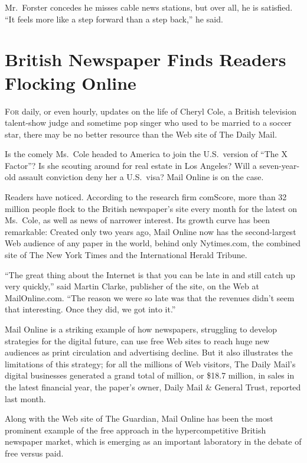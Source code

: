 ﻿\documentclass[12pt]{article}
\begin{document}
Mr.~Forster concedes he misses cable news stations, but over all, he is satisfied. ``It feels more
like a step forward than a step back,'' he said.

\section{British Newspaper Finds Readers Flocking Online}

\lettrine{F}{or} daily, or even hourly, updates on the life of Cheryl Cole,
a British television talent-show judge and sometime pop singer who used to be married to a soccer
star, there may be no better resource than the Web site of The Daily Mail.

Is the comely Ms.~Cole headed to America to join the U.S.~version of ``The X Factor''? Is she
scouting around for real estate in Los Angeles? Will a seven-year-old assault conviction deny her a
U.S.~visa? Mail Online is on the case.

Readers have noticed. According to the research firm comScore, more than 32 million people flock to
the British newspaper's site every month for the latest on Ms.~Cole, as well as news of narrower
interest. Its growth curve has been remarkable: Created only two years ago, Mail Online now has the
second-largest Web audience of any paper in the world, behind only Nytimes.com, the combined site of
The New York Times and the International Herald Tribune.

``The great thing about the Internet is that you can be late in and still catch up very quickly,''
said Martin Clarke, publisher of the site, on the Web at MailOnline.com. ``The reason we were so
late was that the revenues didn't seem that interesting. Once they did, we got into it.''

Mail Online is a striking example of how newspapers, struggling to develop strategies for the
digital future, can use free Web sites to reach huge new audiences as print circulation and
advertising decline. But it also illustrates the limitations of this strategy; for all the millions
of Web visitors, The Daily Mail's digital businesses generated a grand total of 
million, or \$18.7 million, in sales in the latest financial year, the paper's owner, Daily Mail \&
General Trust, reported last month.

Along with the Web site of The Guardian, Mail Online has been the most prominent example of the free
approach in the hypercompetitive British newspaper market, which is emerging as an important
laboratory in the debate of free versus paid.
\end{document}

